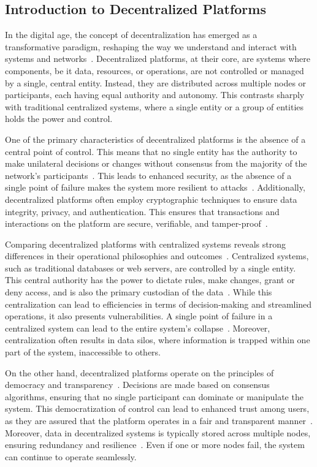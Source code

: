 \subsection{Introduction to Decentralized Platforms}
In the digital age, the concept of decentralization has emerged as a transformative paradigm, reshaping the way we understand and interact with systems and networks~\cite{Tverdokhlib.2022}. Decentralized platforms, at their core, are systems where components, be it data, resources, or operations, are not controlled or managed by a single, central entity. Instead, they are distributed across multiple nodes or participants, each having equal authority and autonomy. This contrasts sharply with traditional centralized systems, where a single entity or a group of entities holds the power and control.

One of the primary characteristics of decentralized platforms is the absence of a central point of control. This means that no single entity has the authority to make unilateral decisions or changes without consensus from the majority of the network's participants~\cite{SEFRAOUI.2022}. This leads to enhanced security, as the absence of a single point of failure makes the system more resilient to attacks~\cite{Maffiola.2022}. Additionally, decentralized platforms often employ cryptographic techniques to ensure data integrity, privacy, and authentication. This ensures that transactions and interactions on the platform are secure, verifiable, and tamper-proof~\cite{SEFRAOUI.2022}.

Comparing decentralized platforms with centralized systems reveals strong differences in their operational philosophies and outcomes~\cite{Maffiola.2022}. Centralized systems, such as traditional databases or web servers, are controlled by a single entity. This central authority has the power to dictate rules, make changes, grant or deny access, and is also the primary custodian of the data~\cite{Maffiola.2022}. While this centralization can lead to efficiencies in terms of decision-making and streamlined operations, it also presents vulnerabilities. A single point of failure in a centralized system can lead to the entire system's collapse~\cite{Maffiola.2022}. Moreover, centralization often results in data silos, where information is trapped within one part of the system, inaccessible to others.

On the other hand, decentralized platforms operate on the principles of democracy and transparency~\cite{SEFRAOUI.2022}. Decisions are made based on consensus algorithms, ensuring that no single participant can dominate or manipulate the system. This democratization of control can lead to enhanced trust among users, as they are assured that the platform operates in a fair and transparent manner~\cite{Hasan.2022}. Moreover, data in decentralized systems is typically stored across multiple nodes, ensuring redundancy and resilience~\cite{Hasan.2022}. Even if one or more nodes fail, the system can continue to operate seamlessly.

